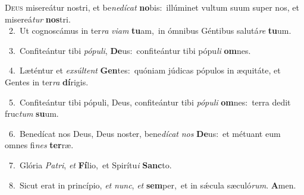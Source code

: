 \lettrine{\initial\textcolor{\initialcolor}{D}}{eus} misereátur nostri, et be\-\textit{ne}\-\textit{dí}\textit{cat} \textbf{no}\-bis:~\star illúminet vultum suum super nos, et misereá\textit{tur} \textbf{nos}\-tri.\\
{\numbfont\textcolor{\numbcolor}{~2.}}~Ut cognoscámus in ter\textit{ra} \textit{vi}\-\textit{am} \textbf{tu}\-am,~\star in ómnibus Géntibus salutá\textit{re} \textbf{tu}\-um.\par
{\numbfont\textcolor{\numbcolor}{~3.}}~Confiteántur tibi \textit{pó}\-\textit{pu}\textit{li}, \textbf{De}\-us:~\star confiteántur tibi pópu\textit{li} \textbf{om}\-nes.\par
{\numbfont\textcolor{\numbcolor}{~4.}}~Læténtur et \textit{ex}\-\textit{súl}\textit{tent} \textbf{Gen}\-tes:~\star quóniam júdicas pópulos in æquitáte, et Gentes in ter\textit{ra} \textbf{dí}\-rigis.\par
{\numbfont\textcolor{\numbcolor}{~5.}}~Confiteántur tibi pópuli, Deus, confiteántur tibi \textit{pó}\-\textit{pu}\textit{li} \textbf{om}\-nes:~\star terra dedit fruc\textit{tum} \textbf{su}\-um.\par
{\numbfont\textcolor{\numbcolor}{~6.}}~Benedícat nos Deus, Deus noster, bene\-\textit{dí}\-\textit{cat} \textit{nos} \textbf{De}\-us:~\star et métuant eum omnes fi\textit{nes} \textbf{ter}\-ræ.\par
{\numbfont\textcolor{\numbcolor}{~7.}}~Glória \textit{Pa}\-\textit{tri}, \textit{et} \textbf{Fí}\-lio,~\star et Spirítu\textit{i} \textbf{Sanc}\-to.\par
{\numbfont\textcolor{\numbcolor}{~8.}}~Sicut erat in princípio, \textit{et} \textit{nunc}\-, \textit{et} \textbf{sem}\-per,~\star et in sǽcula sæculó\-\textit{rum}\-. \textbf{A}\-men.\par
